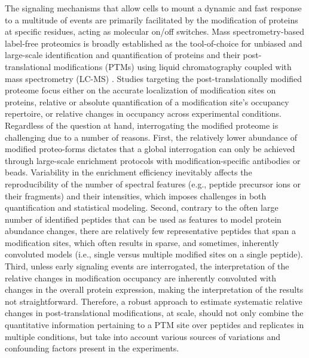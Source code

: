 \documentclass[mcp]{article}
\numberwithin{figure}{section} %
\numberwithin{table}{section}
\begin{document}
The signaling mechanisms that allow cells to mount a dynamic and fast response to a multitude of events are primarily facilitated by the modification of proteins at specific residues, acting as molecular on/off switches.\cite{Deribe} \cite{Cohen}  Mass spectrometry-based label-free proteomics is broadly established as the tool-of-choice for unbiased and large-scale identification and quantification of proteins and their post-translational modifications (PTMs) using liquid chromatography coupled with mass spectrometry (LC-MS)\cite{Kall:2011ub} \cite{Roepstorff}. Studies targeting the post-translationally modified proteome focus either on the accurate localization of modification sites on proteins, relative or absolute quantification of a modification site’s occupancy repertoire, or relative changes in occupancy across experimental conditions.\cite{Mann} Regardless of the question at hand, interrogating the modified proteome is challenging due to a number of reasons. First, the relatively lower abundance of modified proteo-forms dictates that a global interrogation can only be achieved through large-scale enrichment protocols with modification-specific antibodies or beads. Variability in the enrichment efficiency inevitably affects the reproducibility of the number of spectral features (e.g., peptide precursor ions or their fragments) and their intensities, which imposes challenges in both quantification and statistical modeling. Second, contrary to the often large number of identified peptides that can be used as features to model protein abundance changes, there are relatively few representative peptides that span a modification sites, which often results in sparse, and sometimes, inherently convoluted models (i.e., single versus multiple modified sites on a single peptide). Third, unless early signaling events are interrogated, the interpretation of the relative changes in modification occupancy are inherently convoluted with changes in the overall protein expression, making the interpretation of the results not straightforward. \cite{Olsen:2013} Therefore, a robust approach to estimate systematic relative changes in post-translational modifications, at scale, should not only combine the quantitative information pertaining to a PTM site over peptides and replicates in multiple conditions, but take into account various sources of variations and confounding factors present in the experiments.
\end{document}

